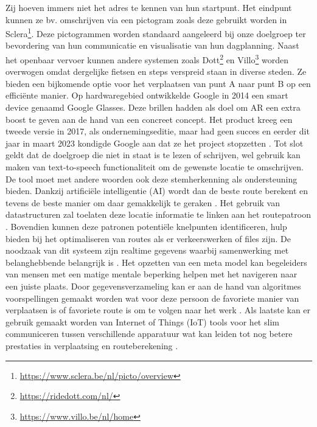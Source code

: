     Zij hoeven immers niet het adres te kennen van hun startpunt. Het eindpunt kunnen ze bv. omschrijven via een pictogram zoals deze gebruikt worden in Sclera\footnote{\url{https://www.sclera.be/nl/picto/overview}}. 
    Deze pictogrammen worden standaard aangeleerd bij onze doelgroep ter bevordering van hun communicatie en visualisatie van hun dagplanning.
    Naast het openbaar vervoer kunnen andere systemen zoals Dott\footnote{\url{https://ridedott.com/nl/}} en Villo\footnote{\url{https://www.villo.be/nl/home}} worden overwogen omdat dergelijke fietsen en steps verspreid staan in diverse steden. 
    Ze bieden een bijkomende optie voor het verplaatsen van punt A naar punt B op een efficiënte manier.
    Op hardwaregebied ontwikkelde Google in 2014 een smart device genaamd Google Glasses. 
    Deze brillen hadden als doel om AR een extra boost te geven aan de hand van een concreet concept. 
    Het product kreeg een tweede versie in 2017, als ondernemingseditie, maar had geen succes en eerder dit jaar in maart 2023 kondigde Google aan dat ze het project stopzetten \autocite{Gvora2023}.
    Tot slot geldt dat de doelgroep die niet in staat is te lezen of schrijven, wel gebruik kan maken van text-to-speech functionaliteit om de gewenste locatie te omschrijven. 
    De tool moet met andere woorden ook deze stemherkenning als ondersteuning bieden. 
    Dankzij artificiële intelligentie (AI) wordt dan de beste route berekent en tevens de beste manier om daar gemakkelijk te geraken \autocite{Soni2023a}. 
    Het gebruik van datastructuren zal toelaten deze locatie informatie te linken aan het routepatroon \autocite{Ruta2010}. 
    Bovendien kunnen deze patronen potentiële knelpunten identificeren, hulp bieden bij het optimaliseren van routes als er verkeerswerken of files zijn. 
    De noodzaak van dit systeem zijn realtime gegevens waarbij samenwerking met belanghebbende belangrijk is \autocite{Ciravegna2018}. 
    Het opzetten van een meta model kan begeleiders van mensen met een matige mentale beperking helpen met het navigeren naar een juiste plaats. 
    Door gegevensverzameling kan er aan de hand van algoritmes voorspellingen gemaakt worden wat voor deze persoon de favoriete manier van verplaatsen is of favoriete route is om te volgen naar het werk \autocite{Stepanov2003}. 
    Als laatste kan er gebruik gemaakt worden van Internet of Things (IoT) tools voor het slim communiceren tussen verschillende apparatuur wat kan leiden tot nog betere prestaties in verplaatsing en routeberekening \autocite{Fatnassi2015}.

